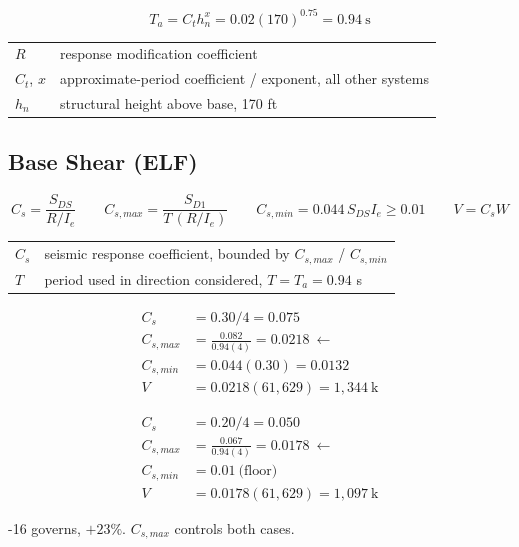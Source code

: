 \documentclass[10pt]{article}
\begin{document}
\begin{equation}
T_a = C_t h_n^x = 0.02(170)^{0.75} = 0.94~\mathrm{s}
\end{equation}
{\ttfamily\footnotesize \begin{tabular}{@{}ll@{}}
$R$ & response modification coefficient \\
$C_t$, $x$ & approximate-period coefficient / exponent, all other systems \\
$h_n$ & structural height above base, 170 ft \\
\end{tabular}}

\subsection{Base Shear (ELF)}

\begin{equation}
C_s = \frac{S_{DS}}{R/I_e} \qquad
C_{s,max} = \frac{S_{D1}}{T\,(R/I_e)} \qquad
C_{s,min} = 0.044\,S_{DS} I_e \ge 0.01 \qquad
V = C_s W
\end{equation}
{\ttfamily\footnotesize \begin{tabular}{@{}ll@{}}
$C_s$ & seismic response coefficient, bounded by $C_{s,max}$ / $C_{s,min}$ \\
$T$ & period used in direction considered, $T = T_a = 0.94$ s \\
\end{tabular}}

\medskip
\noindent
\begin{minipage}[t]{0.48\linewidth}
\begin{align*}
C_s &= 0.30/4 = 0.075 \\
C_{s,max} &= \tfrac{0.082}{0.94(4)} = 0.0218 \ \leftarrow \\
C_{s,min} &= 0.044(0.30) = 0.0132 \\
V &= 0.0218(61{,}629) = \boxed{1{,}344~\mathrm{k}}
\end{align*}
\end{minipage}\hfill
\begin{minipage}[t]{0.48\linewidth}
\begin{align*}
C_s &= 0.20/4 = 0.050 \\
C_{s,max} &= \tfrac{0.067}{0.94(4)} = 0.0178 \ \leftarrow \\
C_{s,min} &= 0.01~\text{(floor)} \\
V &= 0.0178(61{,}629) = \boxed{1{,}097~\mathrm{k}}
\end{align*}
\end{minipage}

-16 governs, $+23\%$. $C_{s,max}$ controls both cases.
\end{document}
